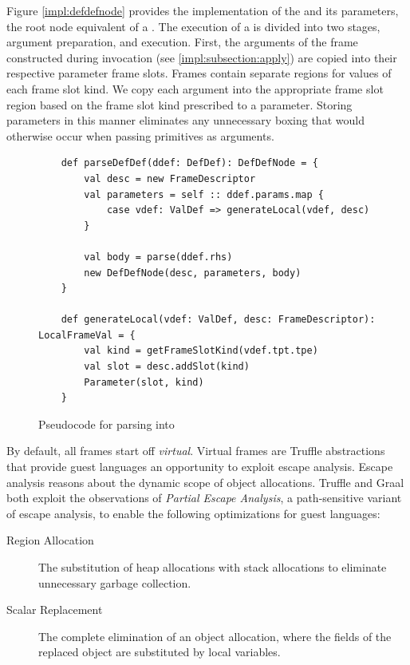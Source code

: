 Figure \ref{impl:defdefnode} provides the implementation of the  and its parameters, the root node equivalent of a .
The execution of a  is divided into two stages, argument preparation, and execution.
First, the arguments of the frame constructed during invocation (see \ref{impl:subsection:apply}) are copied into their respective parameter frame slots.
Frames contain separate regions for values of each frame slot kind.
We copy each argument into the appropriate frame slot region based on the frame slot kind prescribed to a parameter.
Storing parameters in this manner eliminates any unnecessary boxing that would otherwise occur when passing primitives as arguments.

\begin{figure}[!htb]
	\begin{verbatim}
	def parseDefDef(ddef: DefDef): DefDefNode = {
		val desc = new FrameDescriptor
		val parameters = self :: ddef.params.map {
			case vdef: ValDef => generateLocal(vdef, desc)
		}
			
		val body = parse(ddef.rhs)
		new DefDefNode(desc, parameters, body)
	}
		
	def generateLocal(vdef: ValDef, desc: FrameDescriptor): LocalFrameVal = {
		val kind = getFrameSlotKind(vdef.tpt.tpe)
		val slot = desc.addSlot(kind)
		Parameter(slot, kind)
	}
	\end{verbatim}
	\caption{Pseudocode for parsing  into }
	\label{impl:parse-defdef}
\end{figure}

By default, all frames start off \textit{virtual}.
Virtual frames are Truffle abstractions that provide guest languages an opportunity to exploit escape analysis.
Escape analysis\cite{escape-analysis} reasons about the dynamic scope of object allocations. 
Truffle and Graal both exploit the observations of \textit{Partial Escape Analysis}\cite{java:partial-escape-analysis}, a path-sensitive variant of escape analysis, to enable the following optimizations for guest languages:

\begin{description}
	\item[Region Allocation\cite{java:escape-analysis,tofte:region-memory}] The substitution of heap allocations with stack allocations to eliminate unnecessary garbage collection.
	\item[Scalar Replacement\cite{java:escape-analysis-optimizations}] The complete elimination of an object allocation, where the fields of the replaced object are substituted by local variables.
\end{description}

